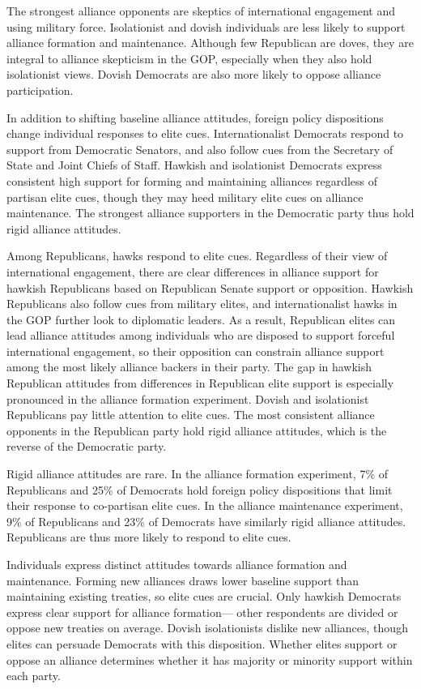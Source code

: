 \documentclass[12pt]{article}
\begin{document}
The strongest alliance opponents are skeptics of international engagement and using military force. 
Isolationist and dovish individuals are less likely to support alliance formation and maintenance. 
Although few Republican are doves, they are integral to alliance skepticism in the GOP, especially when they also hold isolationist views.
Dovish Democrats are also more likely to oppose alliance participation.  


In addition to shifting baseline alliance attitudes, foreign policy dispositions change individual responses to elite cues. 
Internationalist Democrats respond to support from Democratic Senators, and also follow cues from the Secretary of State and Joint Chiefs of Staff. 
Hawkish and isolationist Democrats express consistent high support for forming and maintaining alliances regardless of partisan elite cues, though they may heed military elite cues on alliance maintenance. 
The strongest alliance supporters in the Democratic party thus hold rigid alliance attitudes.


Among Republicans, hawks respond to elite cues. 
Regardless of their view of international engagement, there are clear differences in alliance support for hawkish Republicans based on Republican Senate support or opposition.
Hawkish Republicans also follow cues from military elites, and internationalist hawks in the GOP further look to diplomatic leaders. 
As a result, Republican elites can lead alliance attitudes among individuals who are disposed to support forceful international engagement, so their opposition can constrain alliance support among the most likely alliance backers in their party. 
The gap in hawkish Republican attitudes from differences in Republican elite support is especially pronounced in the alliance formation experiment. 
Dovish and isolationist Republicans pay little attention to elite cues. 
The most consistent alliance opponents in the Republican party hold rigid alliance attitudes, which is the reverse of the Democratic party. 


Rigid alliance attitudes are rare. 
In the alliance formation experiment, 7\% of Republicans and 25\% of Democrats hold foreign policy dispositions that limit their response to co-partisan elite cues. 
In the alliance maintenance experiment, 9\% of Republicans and 23\% of Democrats have similarly rigid alliance attitudes.
Republicans are thus more likely to respond to elite cues.


Individuals express distinct attitudes towards alliance formation and maintenance. 
Forming new alliances draws lower baseline support than maintaining existing treaties, so elite cues are crucial. 
Only hawkish Democrats express clear support for alliance formation--- other respondents are divided or oppose new treaties on average.
Dovish isolationists dislike new alliances, though elites can persuade Democrats with this disposition. 
Whether elites support or oppose an alliance determines whether it has majority or minority support within each party. 
\end{document}
